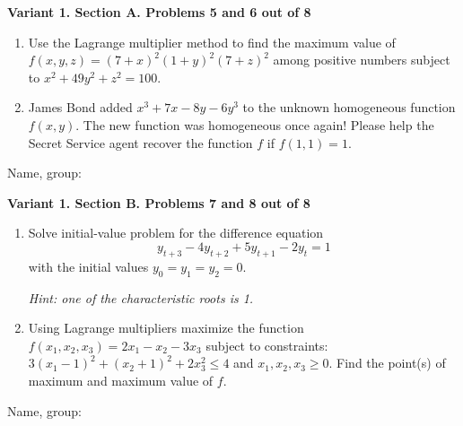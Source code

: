 \documentclass[12pt,a4paper]{article}
\begin{document}
\newpage
\textbf{Variant 1. Section A. Problems 5 and 6 out of 8}

\begin{enumerate}[resume]

\item Use the Lagrange multiplier method to find the maximum value of $f(x,y,z)=(7+x)^2(1+y)^2(7+z)^2$ among positive numbers subject to $x^2 + 49y^2 + z^2 = 100$.

\item James Bond added $x^3+7x-8y - 6y^3$ to the unknown homogeneous function $f(x, y)$. The new function was homogeneous once again! Please help the Secret Service agent recover the function $f$ if $f(1, 1)=1$.

\end{enumerate}


\begin{framed}
\begin{minipage}{42em}
Name, group:\vspace*{3ex}\par
\noindent\dotfill
\end{minipage}
\end{framed}

\newpage
\textbf{Variant 1. Section B. Problems 7 and 8 out of 8}

\begin{enumerate}[resume]

\item Solve initial-value problem for the difference equation
\[
y_{t+3} -4y_{t+2} +5y_{t+1} -2y_{t} =1
\]
with the initial values $y_{0} =y_{1} =y_{2} =0$.

\textit{Hint: one of the characteristic roots is 1.}

\item Using Lagrange multipliers maximize the function $f(x_1,x_2,x_3)=2x_1-x_2-3x_3$ subject to constraints:   $3(x_1-1)^2+(x_2+1)^2+2x_3^2\leq 4$ and $x_1, x_2, x_3 \geq 0$. Find the point(s) of maximum and maximum value of $f$.

\end{enumerate}


\begin{framed}
\begin{minipage}{42em}
Name, group:\vspace*{3ex}\par
\noindent\dotfill
\end{minipage}
\end{framed}

\end{document}
